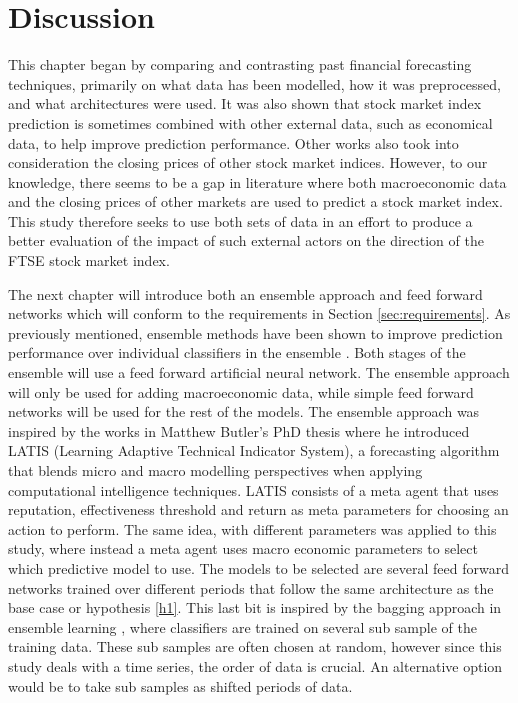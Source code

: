 \documentclass{UoYCSproject}
\begin{document}
\section{Discussion}
\label{sec:discussion}
This chapter began by comparing and contrasting past financial forecasting techniques, primarily on what data has been modelled, how it was preprocessed, and what architectures were used. It was also shown that stock market index prediction is sometimes combined with other external data, such as economical data, to help improve prediction performance. Other works also took into consideration the closing prices of other stock market indices. However, to our knowledge, there seems to be a gap in literature where both macroeconomic data and the closing prices of other markets are used to predict a stock market index. This study therefore seeks to use both sets of data in an effort to produce a better evaluation of the impact of such external actors on the direction of the FTSE stock market index.   

The next chapter will introduce both an ensemble approach and feed forward networks which will conform to the requirements in Section \ref{sec:requirements}. As previously mentioned, ensemble methods have been shown to improve prediction performance over individual classifiers in the ensemble \cite{opitz1999popular}. Both stages of the ensemble will use a feed forward artificial neural network. The ensemble approach will only be used for adding macroeconomic data, while simple feed forward networks will be used for the rest of the models. The ensemble approach was inspired by the works in Matthew Butler's PhD thesis \cite{butler2012computational} where he introduced LATIS (Learning Adaptive Technical Indicator System), a forecasting algorithm that blends micro and macro modelling perspectives when applying computational intelligence techniques. LATIS consists of a meta agent that uses reputation, effectiveness threshold and return as meta parameters for choosing an action to perform. The same idea, with different parameters was applied to this study, where instead a meta agent uses macro economic parameters to select which predictive model to use. The models to be selected are several feed forward networks trained over different periods that follow the same architecture as the base case or hypothesis \ref{h1}. This last bit is inspired by the bagging approach in ensemble learning \cite{breiman1996bagging}, where classifiers are trained on several sub sample of the training data. These sub samples are often chosen at random, however since this study deals with a time series, the order of data is crucial. An alternative option would be to take sub samples as shifted periods of data.
\end{document}
